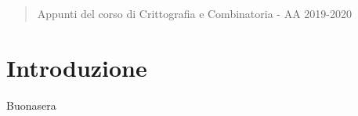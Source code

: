 \documentclass[12pt]{article}
\begin{document}
\maketitle
\tableofcontents
\begin{abstract}
Appunti del corso di Crittografia e Combinatoria - AA 2019-2020
\end{abstract}

\section{Introduzione}
Buonasera
\end{document}
